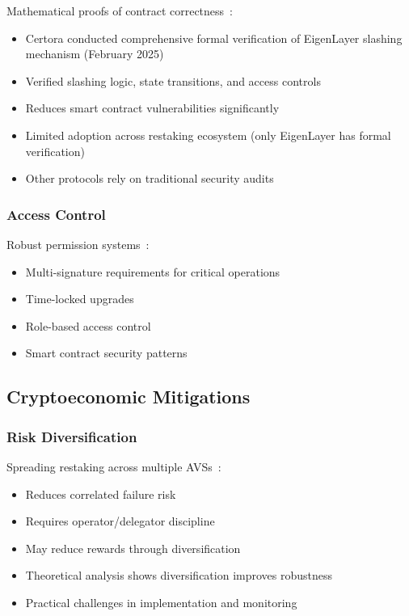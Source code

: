 \documentclass[runningheads]{llncs}
\begin{document}
Mathematical proofs of contract correctness~\cite{ahmed2021survey}:
\begin{itemize}
    \item Certora conducted comprehensive formal verification of EigenLayer slashing mechanism (February 2025)~\cite{certora2025}
    \item Verified slashing logic, state transitions, and access controls
    \item Reduces smart contract vulnerabilities significantly
    \item Limited adoption across restaking ecosystem (only EigenLayer has formal verification)
    \item Other protocols rely on traditional security audits
\end{itemize}

\subsubsection{Access Control}

Robust permission systems~\cite{rodler2018sereum,zhang2020smart}:
\begin{itemize}
    \item Multi-signature requirements for critical operations
    \item Time-locked upgrades
    \item Role-based access control
    \item Smart contract security patterns~\cite{luu2016making,atzei2017survey}
\end{itemize}

\subsection{Cryptoeconomic Mitigations}

\subsubsection{Risk Diversification}

Spreading restaking across multiple AVSs~\cite{durvasula2024robust}:
\begin{itemize}
    \item Reduces correlated failure risk
    \item Requires operator/delegator discipline
    \item May reduce rewards through diversification
    \item Theoretical analysis shows diversification improves robustness~\cite{durvasula2024robust}
    \item Practical challenges in implementation and monitoring
\end{itemize}
\end{document}
